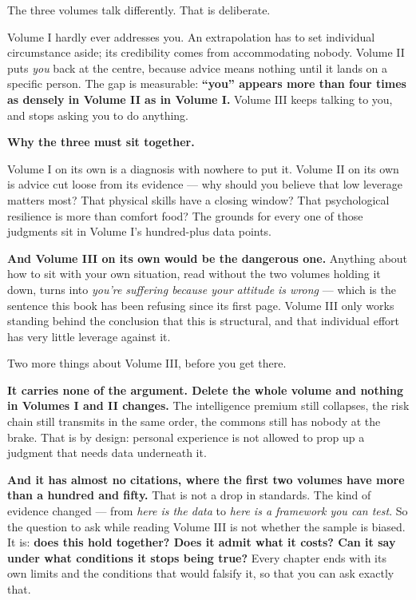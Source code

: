 \documentclass[11pt,a4paper]{article}
\begin{document}
The three volumes talk differently. That is deliberate.

Volume I hardly ever addresses you. An extrapolation has to set individual circumstance aside; its credibility comes from accommodating nobody. Volume II puts \textit{you} back at the centre, because advice means nothing until it lands on a specific person. The gap is measurable: \textbf{``you'' appears more than four times as densely in Volume II as in Volume I.} Volume III keeps talking to you, and stops asking you to do anything.

\textbf{Why the three must sit together.}

Volume I on its own is a diagnosis with nowhere to put it. Volume II on its own is advice cut loose from its evidence --- why should you believe that low leverage matters most? That physical skills have a closing window? That psychological resilience is more than comfort food? The grounds for every one of those judgments sit in Volume I's hundred-plus data points.

\textbf{And Volume III on its own would be the dangerous one.} Anything about how to sit with your own situation, read without the two volumes holding it down, turns into \textit{you're suffering because your attitude is wrong} --- which is the sentence this book has been refusing since its first page. Volume III only works standing behind the conclusion that this is structural, and that individual effort has very little leverage against it.

Two more things about Volume III, before you get there.

\textbf{It carries none of the argument. Delete the whole volume and nothing in Volumes I and II changes.} The intelligence premium still collapses, the risk chain still transmits in the same order, the commons still has nobody at the brake. That is by design: personal experience is not allowed to prop up a judgment that needs data underneath it.

\textbf{And it has almost no citations, where the first two volumes have more than a hundred and fifty.} That is not a drop in standards. The kind of evidence changed --- from \textit{here is the data} to \textit{here is a framework you can test}. So the question to ask while reading Volume III is not whether the sample is biased. It is: \textbf{does this hold together? Does it admit what it costs? Can it say under what conditions it stops being true?} Every chapter ends with its own limits and the conditions that would falsify it, so that you can ask exactly that.
\end{document}

